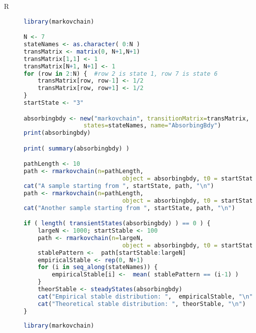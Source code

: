 
\begin{description}



\item[R] 


\begin{lstlisting}[language=R]
library(markovchain)

N <- 7
stateNames <- as.character( 0:N )
transMatrix <- matrix(0, N+1,N+1)
transMatrix[1,1] <- 1
transMatrix[N+1, N+1] <- 1
for (row in 2:N) {  #row 2 is state 1, row 7 is state 6
    transMatrix[row, row-1] <- 1/2
    transMatrix[row, row+1] <- 1/2
}
startState <- "3"

absorbingbdy <- new("markovchain", transitionMatrix=transMatrix,
                 states=stateNames, name="AbsorbingBdy")
print(absorbingbdy)

print( summary(absorbingbdy) )

pathLength <- 10 
path <- rmarkovchain(n=pathLength,
                            object = absorbingbdy, t0 = startState)
cat("A sample starting from ", startState, path, "\n")
path <- rmarkovchain(n=pathLength,
                            object = absorbingbdy, t0 = startState)
cat("Another sample starting from ", startState, path, "\n")

if ( length( transientStates(absorbingbdy) ) == 0 ) {
    largeN <- 1000; startStable <- 100
    path <- rmarkovchain(n=largeN,
                            object = absorbingbdy, t0 = startState)
    stablePattern <-  path[startStable:largeN]
    empiricalStable <- rep(0, N+1)
    for (i in seq_along(stateNames)) { 
        empiricalStable[i] <-  mean( stablePattern == (i-1) )
    }
    theorStable <- steadyStates(absorbingbdy)
    cat("Empirical stable distribution: ",  empiricalStable, "\n")
    cat("Theoretical stable distribution: ", theorStable, "\n")
}
\end{lstlisting}  


\begin{lstlisting}[language=R]
library(markovchain)


\end{lstlisting}
\end{description}
